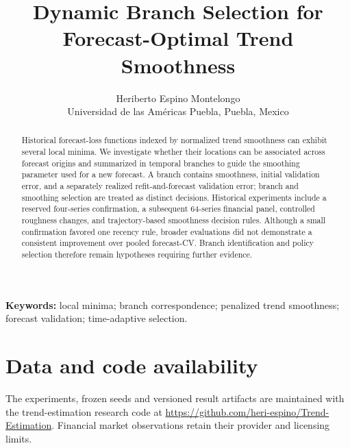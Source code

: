 \documentclass[11pt]{article}
\begin{document}
\title{Dynamic Branch Selection for Forecast-Optimal Trend Smoothness}
\author{Heriberto Espino Montelongo\\Universidad de las Am\'ericas Puebla, Puebla, Mexico}
\date{}
\maketitle

\begin{abstract}
Historical forecast-loss functions indexed by normalized trend smoothness
can exhibit several local minima. We investigate whether their locations
can be associated across forecast origins and summarized in temporal
branches to guide the smoothing parameter used for a new forecast.
A branch contains smoothness, initial validation error, and a separately
realized refit-and-forecast validation error; branch and smoothing
selection are treated as distinct decisions. Historical experiments
include a reserved four-series confirmation, a subsequent 64-series
financial panel, controlled roughness changes, and trajectory-based
smoothness decision rules. Although a small confirmation favored one
recency rule, broader evaluations did not demonstrate a consistent
improvement over pooled forecast-CV. Branch identification and policy
selection therefore remain hypotheses requiring further evidence.
\end{abstract}
\noindent\textbf{Keywords:} local minima; branch correspondence; penalized
trend smoothness; forecast validation; time-adaptive selection.






\section*{Data and code availability}
The experiments, frozen seeds and versioned result artifacts are maintained
with the trend-estimation research code at
\url{https://github.com/heri-espino/Trend-Estimation}.
Financial market observations retain their provider and licensing limits.



\end{document}
